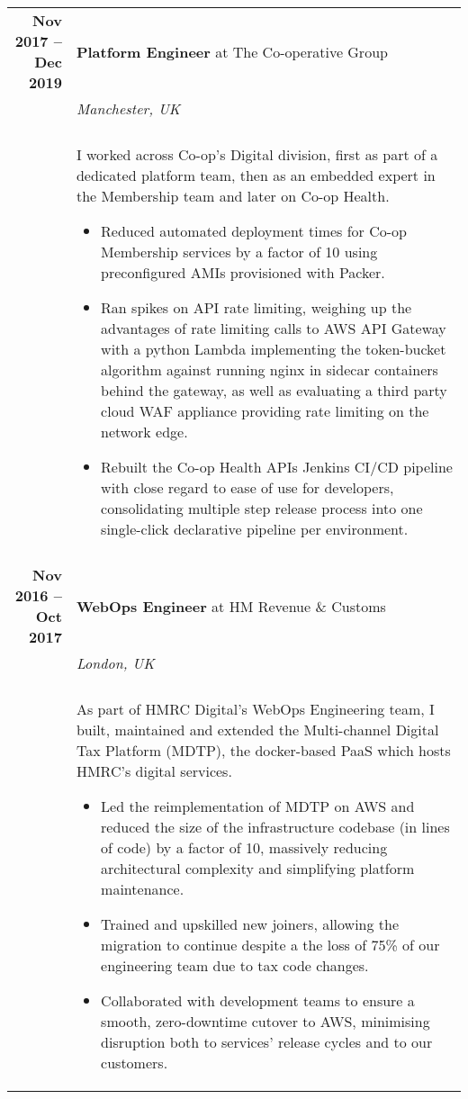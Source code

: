 \documentclass[a4paper,10pt]{article} %
\begin{document}
\begin{tabularx}{\textwidth}{r|X}
\textbf{Nov 2017 -- Dec 2019}       & \textbf{Platform Engineer} at The Co-operative Group \\
                                    & \emph{Manchester, UK} \\
                                    & \\
                                    & \footnotesize
    {I worked across Co-op's Digital division, first as part of a dedicated
        platform team, then as an embedded expert in the Membership team and
        later on Co-op Health.
    \begin{itemize}
    \item Reduced automated deployment times for Co-op Membership services by a
        factor of 10 using preconfigured AMIs provisioned with Packer.
    \item Ran spikes on API rate limiting, weighing up the advantages of rate
        limiting calls to AWS API Gateway with a python Lambda implementing the
        token-bucket algorithm against running nginx in sidecar containers
        behind the gateway, as well as evaluating a third party cloud WAF
        appliance providing rate limiting on the network edge.
    \item Rebuilt the Co-op Health APIs Jenkins CI/CD pipeline with close
        regard to ease of use for developers, consolidating multiple step
        release process into one single-click declarative pipeline per
        environment.
    \end{itemize}}\\

\multicolumn{2}{r}{} \\ %

\textbf{Nov 2016 -- Oct 2017}        & \textbf{WebOps Engineer} at HM Revenue \& Customs \\
                                    & \emph{London, UK} \\
                                    & \\
                                    & \footnotesize
    {As part of HMRC Digital's WebOps Engineering team, I built, maintained and
        extended the Multi-channel Digital Tax Platform (MDTP), the
        docker-based PaaS which hosts HMRC's digital services.
    \begin{itemize}
    \item Led the reimplementation of MDTP on AWS and reduced the size of the
        infrastructure codebase (in lines of code) by a factor of 10, massively
        reducing architectural complexity and simplifying platform maintenance.
    \item Trained and upskilled new joiners, allowing the migration to continue
        despite a the loss of 75\% of our engineering team due to tax code
        changes.
    \item Collaborated with development teams to ensure a smooth, zero-downtime
        cutover to AWS, minimising disruption both to services' release cycles
        and to our customers.
    \end{itemize}}\\


\end{tabularx}
\end{document}
